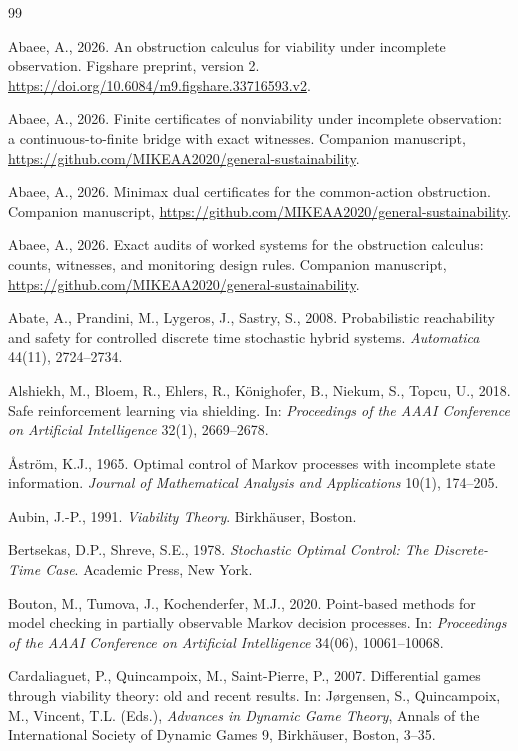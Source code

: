 \documentclass[11pt,a4paper]{article}
\theoremstyle{plain}
\theoremstyle{definition}
\theoremstyle{remark}
\begin{document}
\begin{thebibliography}{99}\footnotesize

 Abaee, A., 2026. An obstruction calculus for viability under incomplete observation. Figshare preprint, version 2. \url{https://doi.org/10.6084/m9.figshare.33716593.v2}.

 Abaee, A., 2026. Finite certificates of nonviability under incomplete observation: a continuous-to-finite bridge with exact witnesses. Companion manuscript, \url{https://github.com/MIKEAA2020/general-sustainability}.

 Abaee, A., 2026. Minimax dual certificates for the common-action obstruction. Companion manuscript, \url{https://github.com/MIKEAA2020/general-sustainability}.

 Abaee, A., 2026. Exact audits of worked systems for the obstruction calculus: counts, witnesses, and monitoring design rules. Companion manuscript, \url{https://github.com/MIKEAA2020/general-sustainability}.

 Abate, A., Prandini, M., Lygeros, J., Sastry, S., 2008. Probabilistic reachability and safety for controlled discrete time stochastic hybrid systems. \emph{Automatica} 44(11), 2724--2734.

 Alshiekh, M., Bloem, R., Ehlers, R., K\"onighofer, B., Niekum, S., Topcu, U., 2018. Safe reinforcement learning via shielding. In: \emph{Proceedings of the AAAI Conference on Artificial Intelligence} 32(1), 2669--2678.

 \AA str\"om, K.J., 1965. Optimal control of Markov processes with incomplete state information. \emph{Journal of Mathematical Analysis and Applications} 10(1), 174--205.

 Aubin, J.-P., 1991. \emph{Viability Theory}. Birkh\"auser, Boston.

 Bertsekas, D.P., Shreve, S.E., 1978. \emph{Stochastic Optimal Control: The Discrete-Time Case}. Academic Press, New York.

 Bouton, M., Tumova, J., Kochenderfer, M.J., 2020. Point-based methods for model checking in partially observable Markov decision processes. In: \emph{Proceedings of the AAAI Conference on Artificial Intelligence} 34(06), 10061--10068.

 Cardaliaguet, P., Quincampoix, M., Saint-Pierre, P., 2007. Differential games through viability theory: old and recent results. In: J{\o}rgensen, S., Quincampoix, M., Vincent, T.L. (Eds.), \emph{Advances in Dynamic Game Theory}, Annals of the International Society of Dynamic Games 9, Birkh\"auser, Boston, 3--35.


\end{thebibliography}
\end{document}
